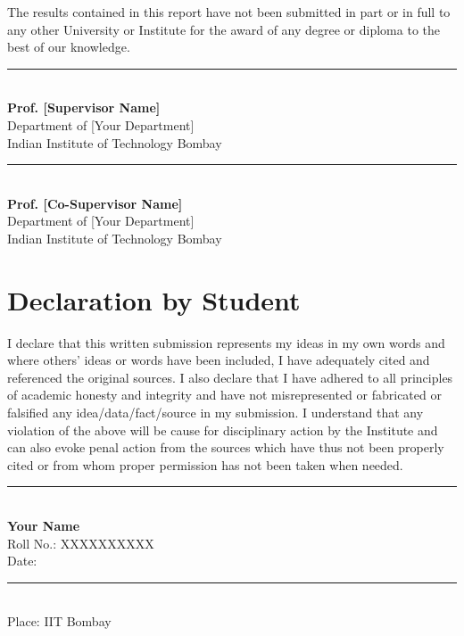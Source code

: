 \documentclass[12pt, a4paper, twoside, openright]{report}
\theoremstyle{definition}
\theoremstyle{remark}
\newcommand\myemptypage{
    \null
    \thispagestyle{empty}
    \addtocounter{page}{-1}
    \newpage
}
\def\authorname{Your Name}
\def\rollnumber{XXXXXXXXXX}
\def\deptname{Department of [Your Department]}
\def\univname{Indian Institute of Technology Bombay}
\begin{document}
The results contained in this report have not been submitted in part or in full to any other University or Institute for the award of any degree or diploma to the best of our knowledge.

\vspace{3cm}

\noindent
\begin{flushleft}
\rule{6cm}{0.4pt}\\
\textbf{Prof. [Supervisor Name]}\\
\deptname\\
\univname
\end{flushleft}

\vspace{2cm}

\noindent
\begin{flushleft}
\rule{6cm}{0.4pt}\\
\textbf{Prof. [Co-Supervisor Name]}\\
\deptname\\
\univname
\end{flushleft}

\myemptypage

\chapter*{Declaration by Student}

\noindent I declare that this written submission represents my ideas in my own words and where others' ideas or words have been included, I have adequately cited and referenced the original sources. I also declare that I have adhered to all principles of academic honesty and integrity and have not misrepresented or fabricated or falsified any idea/data/fact/source in my submission. I understand that any violation of the above will be cause for disciplinary action by the Institute and can also evoke penal action from the sources which have thus not been properly cited or from whom proper permission has not been taken when needed.

\vspace{3cm}

\noindent
\begin{flushleft}
\rule{6cm}{0.4pt}\\
\textbf{\authorname}\\
Roll No.: \rollnumber\\
Date: \rule{3cm}{0.4pt}\\
Place: IIT Bombay
\end{flushleft}
\end{document}
